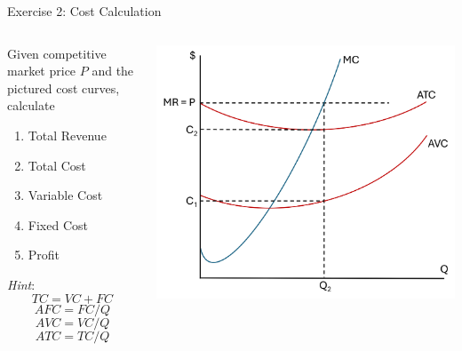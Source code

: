 \documentclass[9pt]{beamer}
\begin{document}
\begin{frame}{Exercise 2: Cost Calculation}
    \begin{columns}[c]
        \begin{column}{0.5\textwidth}
        Given competitive market price $P$ and the pictured cost curves, calculate
        \vspace{5pt}
            \begin{enumerate}
                \item Total Revenue
                \item Total Cost
                \item Variable Cost
                \item Fixed Cost
                \item Profit
            \end{enumerate}
            \vspace{5pt}
            \textit{Hint}: \[TC = VC + FC\] \[AFC = FC/Q\] \[AVC = VC/Q\] \[ATC = TC/Q\]
        \end{column}
        \begin{column}{0.5\textwidth}
            \includegraphics[width=\linewidth]{cost_exercise.png}
        \end{column}
    \end{columns}
\end{frame}
\end{document}
